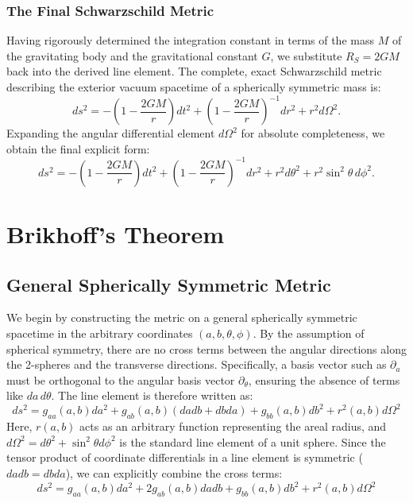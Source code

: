 \documentclass[11pt, a4paper]{report}
\begin{document}
\subsubsection{The Final Schwarzschild Metric}
Having rigorously determined the integration constant in terms of the mass $M$ of the gravitating body and the gravitational constant $G$, we substitute $R_S = 2GM$ back into the derived line element. The complete, exact Schwarzschild metric describing the exterior vacuum spacetime of a spherically symmetric mass is:
\begin{equation}
ds^2 = -\left( 1 - \frac{2GM}{r} \right) dt^2 + \left( 1 - \frac{2GM}{r} \right)^{-1} dr^2 + r^2 d\Omega^2.
\end{equation}
Expanding the angular differential element $d\Omega^2$ for absolute completeness, we obtain the final explicit form:
\begin{equation}
ds^2 = -\left( 1 - \frac{2GM}{r} \right) dt^2 + \left( 1 - \frac{2GM}{r} \right)^{-1} dr^2 + r^2 d\theta^2 + r^2 \sin^2\theta \, d\phi^2.
\end{equation}


\section{Brikhoff's Theorem}
\subsection{General Spherically Symmetric Metric}

We begin by constructing the metric on a general spherically symmetric spacetime in the arbitrary coordinates $(a, b, \theta, \phi)$. By the assumption of spherical symmetry, there are no cross terms between the angular directions along the 2-spheres and the transverse directions. Specifically, a basis vector such as $\partial_a$ must be orthogonal to the angular basis vector $\partial_\theta$, ensuring the absence of terms like $da \, d\theta$. The line element is therefore written as:
\begin{equation}
ds^{2}=g_{aa}(a,b)da^{2}+g_{ab}(a,b)(da db+db da)+g_{bb}(a,b)db^{2}+r^{2}(a,b)d\Omega^{2}
\end{equation}
Here, $r(a,b)$ acts as an arbitrary function representing the areal radius, and $d\Omega^2 = d\theta^2 + \sin^2\theta d\phi^2$ is the standard line element of a unit sphere. Since the tensor product of coordinate differentials in a line element is symmetric ($da db = db da$), we can explicitly combine the cross terms:
\begin{equation}
ds^{2}=g_{aa}(a,b)da^{2}+2g_{ab}(a,b)da db+g_{bb}(a,b)db^{2}+r^{2}(a,b)d\Omega^{2}
\end{equation}
\end{document}
